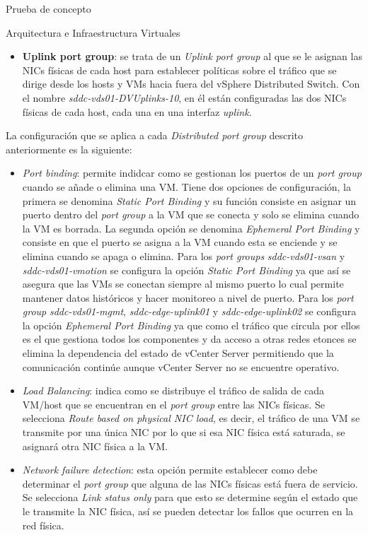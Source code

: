\begin{section}{Prueba de concepto}
\begin{subsection}{Arquitectura e Infraestructura Virtuales\cite{CFVirtInfraes}}
\begin{itemize}
        \item \textbf{Uplink port group}: se trata de un \textit{Uplink port group} al que se le asignan las NICs físicas de cada host para establecer políticas sobre el tráfico que se dirige desde los hosts y VMs hacia fuera del vSphere Distributed Switch. Con el nombre \textit{sddc-vds01-DVUplinks-10}, en él están configuradas las dos NICs físicas de cada host, cada una en una interfaz \textit{uplink}.
        
\end{itemize}
La configuración que se aplica a cada \textit{Distributed port group} descrito anteriormente es la siguiente:
\begin{itemize}
  \item \textit{Port binding}: permite indidcar como se gestionan los puertos de un \textit{port group} cuando se añade o elimina una VM. Tiene dos opciones de configuración, la primera se denomina \textit{Static Port Binding} y su función consiste en asignar un puerto dentro del \textit{port group} a la VM que se conecta y solo se elimina cuando la VM es borrada. La segunda opción se denomina \textit{Ephemeral Port Binding} y consiste en que el puerto se asigna a la VM cuando esta se enciende y se elimina cuando se apaga o elimina. Para los \textit{port groups} \textit{sddc-vds01-vsan} y \textit{sddc-vds01-vmotion} se configura la opción \textit{Static Port Binding} ya que así se asegura que las VMs se conectan siempre al mismo puerto lo cual permite mantener datos históricos y hacer monitoreo a nivel de puerto. Para los \textit{port group} \textit{sddc-vds01-mgmt}, \textit{sddc-edge-uplink01} y \textit{sddc-edge-uplink02} se configura la opción \textit{Ephemeral Port Binding} ya que como el tráfico que circula por ellos es el que gestiona todos los componentes y da acceso a otras redes etonces se elimina la dependencia del estado de vCenter Server permitiendo que la comunicación continúe aunque vCenter Server no se encuentre operativo.

  \item \textit{Load Balancing}: indica como se distribuye el tráfico de salida de cada VM/host que se encuentran en el \textit{port group} entre las NICs físicas. Se selecciona \textit{Route based on physical NIC load}, es decir, el tráfico de una VM se transmite por una única NIC por lo que si esa NIC física está saturada, se asignará otra NIC física a la VM.
  
  \item \textit{Network failure detection}: esta opción permite establecer como debe determinar el \textit{port group} que alguna de las NICs físicas está fuera de servicio. Se selecciona \textit{Link status only} para que esto se determine según el estado que le transmite la NIC física, así se pueden detectar los fallos que ocurren en la red física.
  

\end{itemize}
\end{subsection}
\end{section}
